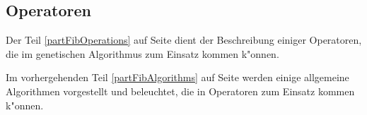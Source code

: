 \documentclass[11pt,a4paper]{article}
\begin{document}
\subsection{Operatoren}

Der Teil \ref{partFibOperations} auf Seite \pageref{partFibOperations} dient der Beschreibung einiger Operatoren, die im genetischen Algorithmus zum Einsatz kommen k"onnen.

Im vorhergehenden Teil \ref{partFibAlgorithms} auf Seite \pageref{partFibAlgorithms} werden einige allgemeine Algorithmen vorgestellt und beleuchtet, die in Operatoren zum Einsatz kommen k"onnen.














\end{document}
